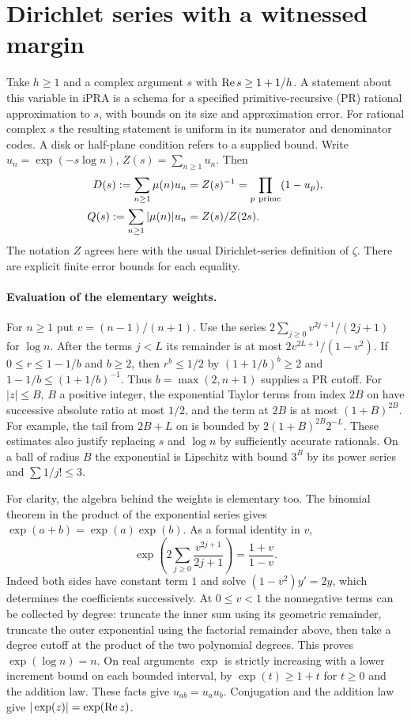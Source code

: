 \section{Dirichlet series with a witnessed margin}
\label{sec:dirichlet-interior}

Take $h\ge1$ and a complex argument $s$ with
$\mathop{\rm Re}s\ge1+1/h$. A statement about this variable in iPRA is a
schema for a specified primitive-recursive (PR) rational approximation to
$s$, with bounds on its size and approximation error. For rational complex
$s$ the resulting statement is uniform in its numerator and denominator
codes. A disk or half-plane condition refers to a supplied bound.
Write $u_n=\exp(-s\log n)$, $Z(s)=\sum_{n\ge1}u_n$. Then
\begin{align}
 D(s):=\sum_{n\ge1}\mu(n)u_n
    &= Z(s)^{-1}=\prod_{p\ {\rm prime}}(1-u_p),\label{eq:mob-ds}\\
 Q(s):=\sum_{n\ge1}|\mu(n)|u_n
    &=Z(s)/Z(2s).\label{eq:mob-sqdir}
\end{align}
The notation $Z$ agrees here with the usual Dirichlet-series definition of
$\zeta$. There are explicit finite error bounds for each equality.

\paragraph{Evaluation of the elementary weights.}
For $n\ge1$ put $v=(n-1)/(n+1)$. Use the series
$2\sum_{j\ge0}v^{2j+1}/(2j+1)$ for $\log n$. After the terms
$j<L$ its remainder is at most $2v^{2L+1}/(1-v^2)$.
If $0\le r\le1-1/b$ and $b\ge2$, then $r^b\le1/2$ by
$(1+1/b)^b\ge2$ and $1-1/b\le(1+1/b)^{-1}$.
Thus $b=\max(2,n+1)$ supplies a PR cutoff.
For $|z|\le B$, $B$ a positive integer, the exponential Taylor terms
from index $2B$ on have successive absolute ratio at most $1/2$,
and the term at $2B$ is at most $(1+B)^{2B}$.
For example, the tail from $2B+L$ on is bounded by
$2(1+B)^{2B}2^{-L}$. These estimates also justify replacing $s$ and
$\log n$ by sufficiently accurate rationals. On a ball of radius $B$
the exponential is Lipschitz with bound $3^B$ by its power series
and $\sum 1/j!\le3$.

For clarity, the algebra behind the weights is elementary too.
The binomial theorem in the product of the exponential series gives
$\exp(a+b)=\exp(a)\exp(b)$. As a formal identity in $v$,
\[
 \exp\!\left(2\sum_{j\ge0}\frac{v^{2j+1}}{2j+1}\right)
       =\frac{1+v}{1-v}.
\]
Indeed both sides have constant term $1$ and solve
$(1-v^2)y'=2y$, which determines the coefficients successively.
At $0\le v<1$ the nonnegative terms can be collected by degree:
truncate the inner sum using its geometric remainder, truncate the outer
exponential using the factorial remainder above, then take a degree cutoff
at the product of the two polynomial degrees. This proves
$\exp(\log n)=n$. On real arguments $\exp$ is strictly increasing with
a lower increment bound on each bounded interval, by
$\exp(t)\ge1+t$ for $t\ge0$ and the addition law. These facts give
$u_{ab}=u_a u_b$. Conjugation and the addition law give
$|\exp(z)|=\exp(\mathop{\rm Re}z)$.

